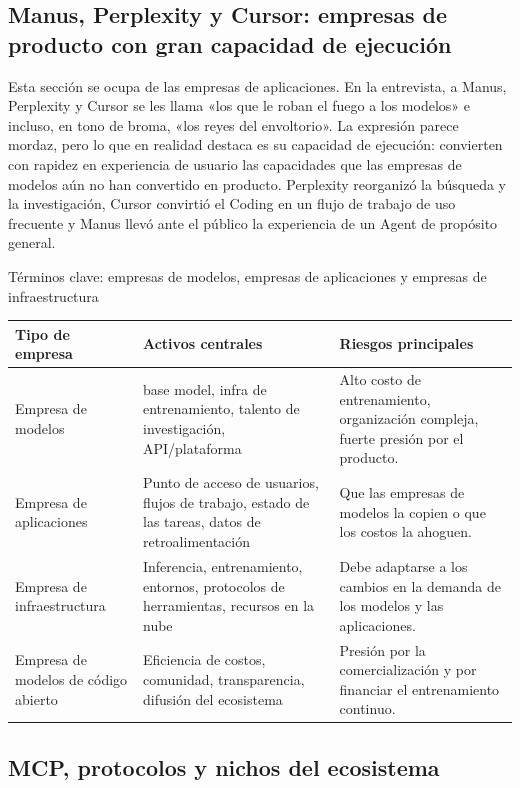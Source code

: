 \documentclass[a4paper]{article}
\begin{document}
\subsection{Manus, Perplexity y Cursor: empresas de producto con gran capacidad de ejecución}

Esta sección se ocupa de las empresas de aplicaciones. En la entrevista, a Manus, Perplexity y Cursor se les llama «los que le roban el fuego a los modelos» e incluso, en tono de broma, «los reyes del envoltorio». La expresión parece mordaz, pero lo que en realidad destaca es su capacidad de ejecución: convierten con rapidez en experiencia de usuario las capacidades que las empresas de modelos aún no han convertido en producto. Perplexity reorganizó la búsqueda y la investigación, Cursor convirtió el Coding en un flujo de trabajo de uso frecuente y Manus llevó ante el público la experiencia de un Agent de propósito general.

\begin{knowledgebox}{Términos clave: empresas de modelos, empresas de aplicaciones y empresas de infraestructura}
\noindent\begin{tabularx}{\textwidth}{p{}p{}X}
\toprule
Tipo de empresa & Activos centrales & Riesgos principales \\
\midrule
Empresa de modelos & base model, infra de entrenamiento, talento de investigación, API/plataforma & Alto costo de entrenamiento, organización compleja, fuerte presión por el producto. \\
Empresa de aplicaciones & Punto de acceso de usuarios, flujos de trabajo, estado de las tareas, datos de retroalimentación & Que las empresas de modelos la copien o que los costos la ahoguen. \\
Empresa de infraestructura & Inferencia, entrenamiento, entornos, protocolos de herramientas, recursos en la nube & Debe adaptarse a los cambios en la demanda de los modelos y las aplicaciones. \\
Empresa de modelos de código abierto & Eficiencia de costos, comunidad, transparencia, difusión del ecosistema & Presión por la comercialización y por financiar el entrenamiento continuo. \\
\bottomrule
\end{tabularx}
\end{knowledgebox}

\subsection{MCP, protocolos y nichos del ecosistema}
\end{document}
